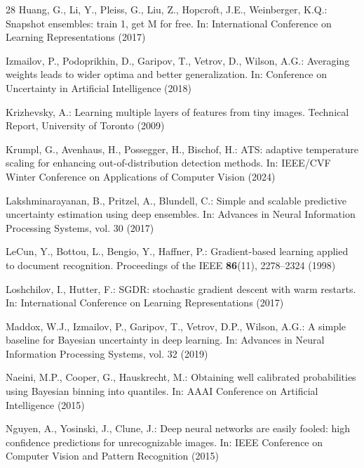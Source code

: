 \documentclass[11pt,a4paper]{article}
\begin{document}
\begin{thebibliography}{28}
 Huang, G., Li, Y., Pleiss, G.,
Liu, Z., Hopcroft, J.E., Weinberger, K.Q.: Snapshot ensembles: train 1,
get M for free. In: International Conference on Learning Representations
(2017)

 Izmailov, P., Podoprikhin,
D., Garipov, T., Vetrov, D., Wilson, A.G.: Averaging weights leads to wider
optima and better generalization. In: Conference on Uncertainty in
Artificial Intelligence (2018)

 Krizhevsky, A.: Learning
multiple layers of features from tiny images. Technical Report, University
of Toronto (2009)

 Krumpl, G., Avenhaus, H.,
Possegger, H., Bischof, H.: ATS: adaptive temperature scaling for enhancing
out-of-distribution detection methods. In: IEEE/CVF Winter Conference on
Applications of Computer Vision (2024)

Lakshminarayanan, B., Pritzel, A., Blundell, C.: Simple and scalable
predictive uncertainty estimation using deep ensembles. In: Advances in
Neural Information Processing Systems, vol. 30 (2017)

 LeCun, Y., Bottou, L., Bengio, Y.,
Haffner, P.: Gradient-based learning applied to document recognition.
Proceedings of the IEEE \textbf{86}(11), 2278--2324 (1998)

 Loshchilov, I.,
Hutter, F.: SGDR: stochastic gradient descent with warm restarts. In:
International Conference on Learning Representations (2017)

 Maddox, W.J., Izmailov, P.,
Garipov, T., Vetrov, D.P., Wilson, A.G.: A simple baseline for Bayesian
uncertainty in deep learning. In: Advances in Neural Information Processing
Systems, vol. 32 (2019)

 Naeini, M.P., Cooper, G.,
Hauskrecht, M.: Obtaining well calibrated probabilities using Bayesian
binning into quantiles. In: AAAI Conference on Artificial Intelligence
(2015)

 Nguyen, A., Yosinski, J., Clune,
J.: Deep neural networks are easily fooled: high confidence predictions
for unrecognizable images. In: IEEE Conference on Computer Vision and
Pattern Recognition (2015)


\end{thebibliography}
\end{document}
